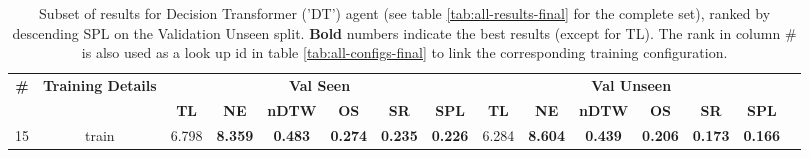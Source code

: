 \begin{table}
\centering
\caption{\label{tab:dt_spatial_features}Subset of results for Decision Transformer ('DT') agent (see table \ref{tab:all-results-final} for the complete set), ranked by descending SPL on the Validation Unseen split. \textbf{Bold} numbers indicate the best results (except for TL). The rank in column \# is also used as a look up id in table \ref{tab:all-configs-final} to link the corresponding training configuration.}
\begin{tabular}{@{\hskip3pt}c@{\hskip3pt}c@{\hskip3pt}c@{\hskip3pt}c@{\hskip3pt}c@{\hskip3pt}c@{\hskip3pt}c@{\hskip3pt}c@{\hskip3pt}c@{\hskip3pt}c@{\hskip3pt}c@{\hskip3pt}c@{\hskip3pt}c@{\hskip3pt}c@{\hskip3pt}c}
\toprule
                                  \textbf{\#} & \textbf{Training Details} & \multicolumn{6}{c}{\textbf{Val Seen}} & \multicolumn{6}{c}{\textbf{Val Unseen}} \\
\cmidrule(l){3-8}\cmidrule(l){9-14}\textbf{~} &                \textbf{~} &       \textbf{TL} &     \textbf{NE} &   \textbf{nDTW} &     \textbf{OS} &     \textbf{SR} &    \textbf{SPL} &         \textbf{TL} &     \textbf{NE} &   \textbf{nDTW} &     \textbf{OS} &     \textbf{SR} &    \textbf{SPL} \\
\midrule
                                           15 &                     train &             6.798 &  \textbf{8.359} &  \textbf{0.483} &  \textbf{0.274} &  \textbf{0.235} &  \textbf{0.226} &               6.284 &  \textbf{8.604} &  \textbf{0.439} &  \textbf{0.206} &  \textbf{0.173} &  \textbf{0.166} \\
\bottomrule
\end{tabular}
\end{table}
